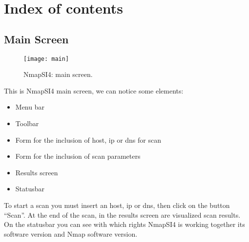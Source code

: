 
\chapter{Index of contents}
\label{ch:Contents}

\section{Main Screen}
\label{sec:ContentsMain}

\begin{figure}[h]
  \centering
  \texttt{[image: main]}
  \caption{NmapSI4: main screen.}
  \label{fig:ContentsMain}
\end{figure}
This is NmapSI4 main screen, we can notice some elements:
\begin{itemize}
\item Menu bar
\item Toolbar
\item Form for the inclusion of host, ip or dns for scan
\item Form for the inclusion of scan parameters
\item Results screen
\item Statusbar
\end{itemize}
To start a scan you must insert an host, ip or dns, then click on the button
``Scan''. At the end of the scan, in the results screen are visualized scan 
results. On the statusbar you can see with which rights NmapSI4 is working 
together its software version and Nmap software version.

